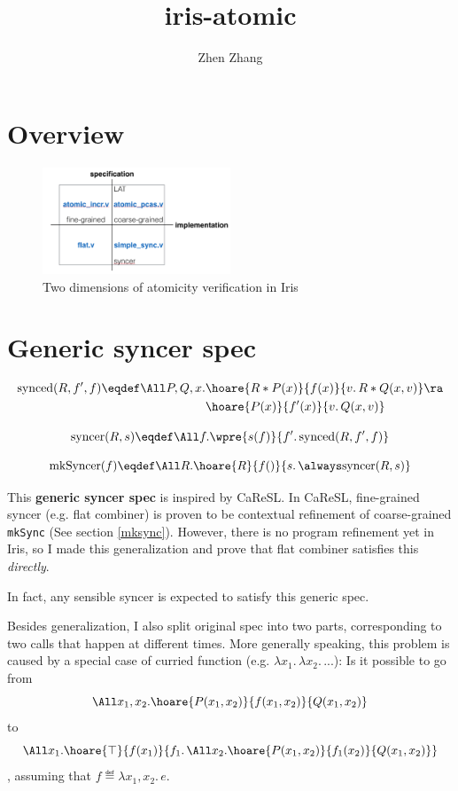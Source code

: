 \documentclass[11pt]{article}
\begin{document}
\title{\bfseries iris-atomic}
\author{Zhen Zhang}
\maketitle

\section{Overview}

\begin{figure}[hb]
  \centering
  \includegraphics[width=0.5\textwidth]{ispace}
  \caption
   {Two dimensions of atomicity verification in Iris}
\end{figure}

\section{Generic syncer spec}

\begin{align*}
  \text{synced}(R, f', f) \eqdef
  \All P, Q, x.
    &\hoare{ R * P(x)}{f(x)}{ v.\,R * Q(x,v) } \ra \\
    &\hoare{ P(x)}{f'(x)}{ v.\,Q(x,v) }
\end{align*}

\[ \text{syncer}(R, s) \eqdef \All f. \wpre{s(f)}{ f'.\, \text{synced}(R, f', f)} \]


\[\text{mkSyncer}(f) \eqdef \All R. \hoare{R}{f()}{ s.\,\always \text{syncer}(R, s)} \]

This \textbf{generic syncer spec} is inspired by CaReSL. In CaReSL, fine-grained syncer (e.g. flat combiner) is proven to be contextual refinement of coarse-grained \texttt{mkSync} (See section \ref{mksync}). However, there is no program refinement yet in Iris, so I made this generalization and prove that flat combiner satisfies this \emph{directly}.

In fact, any sensible syncer is expected to satisfy this generic spec.

Besides generalization, I also split original spec into two parts, corresponding to two calls that happen at different times. More generally speaking, this problem is caused by a special case of curried function (e.g. $\lambda x_1.\, \lambda x_2.\,...$): Is it possible to go from \[\All x_1, x_2. \hoare{P(x_1, x_2)}{f(x_1, x_2)}{Q(x_1, x_2)}\] to \[\All x_1. \hoare{\top}{f(x_1)}{f_1.\, \All x_2. \hoare{P(x_1, x_2)}{f_1(x_2)}{Q(x_1, x_2)}}\], assuming that \(f \eqdef \lambda x_1, x_2.\, e\).
\end{document}
